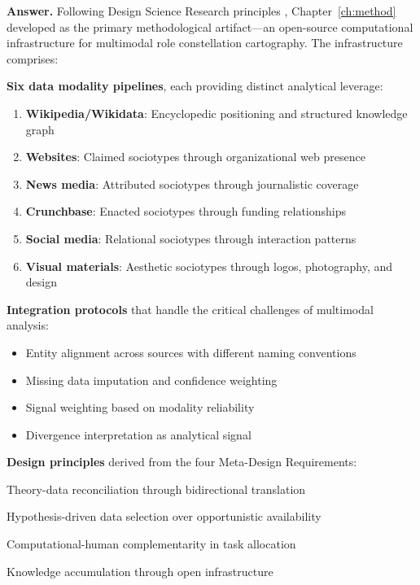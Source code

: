 \documentclass[../main.tex]{subfiles}
\begin{document}
\noindent\textbf{Answer.} Following Design Science Research principles \cite{hevner2004design,peffers2007dsr}, Chapter~\ref{ch:method} developed \RoleBox{} as the primary methodological artifact---an open-source computational infrastructure for multimodal role constellation cartography. The infrastructure comprises:

\textbf{Six data modality pipelines}, each providing distinct analytical leverage:
\begin{enumerate}[leftmargin=*, itemsep=0.2em]
\item \textbf{Wikipedia/Wikidata}: Encyclopedic positioning and structured knowledge graph
\item \textbf{Websites}: Claimed sociotypes through organizational web presence
\item \textbf{News media}: Attributed sociotypes through journalistic coverage
\item \textbf{Crunchbase}: Enacted sociotypes through funding relationships
\item \textbf{Social media}: Relational sociotypes through interaction patterns
\item \textbf{Visual materials}: Aesthetic sociotypes through logos, photography, and design
\end{enumerate}

\textbf{Integration protocols} that handle the critical challenges of multimodal analysis:
\begin{itemize}[leftmargin=*, itemsep=0.2em]
\item Entity alignment across sources with different naming conventions
\item Missing data imputation and confidence weighting
\item Signal weighting based on modality reliability
\item Divergence interpretation as analytical signal
\end{itemize}

\textbf{Design principles} derived from the four Meta-Design Requirements:
\begin{description}[leftmargin=0.5cm, itemsep=0.2em]
\item[MDR-1] Theory-data reconciliation through bidirectional translation
\item[MDR-2] Hypothesis-driven data selection over opportunistic availability
\item[MDR-3] Computational-human complementarity in task allocation
\item[MDR-4] Knowledge accumulation through open infrastructure
\end{description}
\end{document}
